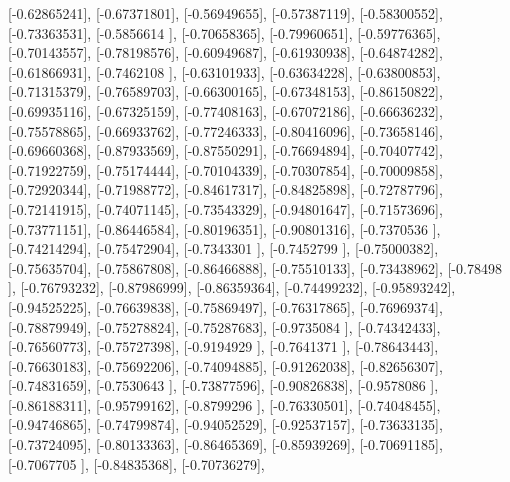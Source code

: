 \documentclass{article}
\begin{document}
       [-0.62865241],
       [-0.67371801],
       [-0.56949655],
       [-0.57387119],
       [-0.58300552],
       [-0.73363531],
       [-0.5856614 ],
       [-0.70658365],
       [-0.79960651],
       [-0.59776365],
       [-0.70143557],
       [-0.78198576],
       [-0.60949687],
       [-0.61930938],
       [-0.64874282],
       [-0.61866931],
       [-0.7462108 ],
       [-0.63101933],
       [-0.63634228],
       [-0.63800853],
       [-0.71315379],
       [-0.76589703],
       [-0.66300165],
       [-0.67348153],
       [-0.86150822],
       [-0.69935116],
       [-0.67325159],
       [-0.77408163],
       [-0.67072186],
       [-0.66636232],
       [-0.75578865],
       [-0.66933762],
       [-0.77246333],
       [-0.80416096],
       [-0.73658146],
       [-0.69660368],
       [-0.87933569],
       [-0.87550291],
       [-0.76694894],
       [-0.70407742],
       [-0.71922759],
       [-0.75174444],
       [-0.70104339],
       [-0.70307854],
       [-0.70009858],
       [-0.72920344],
       [-0.71988772],
       [-0.84617317],
       [-0.84825898],
       [-0.72787796],
       [-0.72141915],
       [-0.74071145],
       [-0.73543329],
       [-0.94801647],
       [-0.71573696],
       [-0.73771151],
       [-0.86446584],
       [-0.80196351],
       [-0.90801316],
       [-0.7370536 ],
       [-0.74214294],
       [-0.75472904],
       [-0.7343301 ],
       [-0.7452799 ],
       [-0.75000382],
       [-0.75635704],
       [-0.75867808],
       [-0.86466888],
       [-0.75510133],
       [-0.73438962],
       [-0.78498   ],
       [-0.76793232],
       [-0.87986999],
       [-0.86359364],
       [-0.74499232],
       [-0.95893242],
       [-0.94525225],
       [-0.76639838],
       [-0.75869497],
       [-0.76317865],
       [-0.76969374],
       [-0.78879949],
       [-0.75278824],
       [-0.75287683],
       [-0.9735084 ],
       [-0.74342433],
       [-0.76560773],
       [-0.75727398],
       [-0.9194929 ],
       [-0.7641371 ],
       [-0.78643443],
       [-0.76630183],
       [-0.75692206],
       [-0.74094885],
       [-0.91262038],
       [-0.82656307],
       [-0.74831659],
       [-0.7530643 ],
       [-0.73877596],
       [-0.90826838],
       [-0.9578086 ],
       [-0.86188311],
       [-0.95799162],
       [-0.8799296 ],
       [-0.76330501],
       [-0.74048455],
       [-0.94746865],
       [-0.74799874],
       [-0.94052529],
       [-0.92537157],
       [-0.73633135],
       [-0.73724095],
       [-0.80133363],
       [-0.86465369],
       [-0.85939269],
       [-0.70691185],
       [-0.7067705 ],
       [-0.84835368],
       [-0.70736279],
\end{document}

